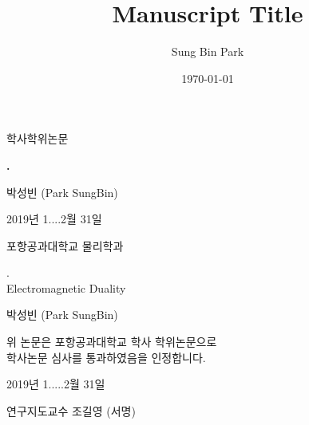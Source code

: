 \documentclass[%
 reprint,
 amsmath,amssymb,
 aps,
 prl,
]{revtex4-1}
\begin{document}
\begin{titlepage}
\begin{center}
\vspace*{5em}

\Large 학사학위논문

\vspace{7em}

\Huge{\textbf{.}}
 
\vfill
 
\Large 박성빈 (Park SungBin)

\vspace{3em} 

2019년 1....2월 31일

\vspace{3em}

포항공과대학교 물리학과

\newpage

\vspace*{5em}

\Huge . \\ \vspace{0.5em} Electromagnetic Duality

\vspace{3em}

\Large 박성빈 (Park SungBin)

\vfill

위 논문은 포항공과대학교 학사 학위논문으로 \\ \vspace{0.5em} 학사논문 심사를 통과하였음을 인정합니다.

\vspace{3em}

2019년 1.....2월 31일

\vspace{3em}

연구지도교수 조길영 (서명)
 
\end{center}

\clearpage
\thispagestyle{empty}

\end{titlepage}

\setcounter{page}{1}

\title{Manuscript Title}

\author{Sung Bin Park}%
%

\date{\today}%
\end{document}
